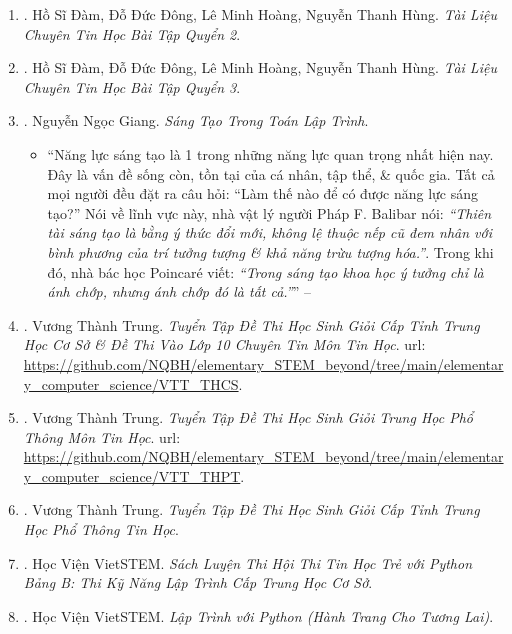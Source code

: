 \documentclass{article}
\begin{document}
\begin{enumerate}
	\item \cite{TL_chuyen_Tin_BT_quyen_2}. Hồ Sĩ Đàm, Đỗ Đức Đông, Lê Minh Hoàng, Nguyễn Thanh Hùng. {\it Tài Liệu Chuyên Tin Học Bài Tập Quyển 2}.
	
	\item \cite{TL_chuyen_Tin_BT_quyen_3}. Hồ Sĩ Đàm, Đỗ Đức Đông, Lê Minh Hoàng, Nguyễn Thanh Hùng. {\it Tài Liệu Chuyên Tin Học Bài Tập Quyển 3}.
	
	\item \cite{Giang_sang_tao_lap_trinh}. {\sc Nguyễn Ngọc Giang}. {\it Sáng Tạo Trong Toán Lập Trình}.	
	\begin{itemize}
		\item ``Năng lực sáng tạo là 1 trong những năng lực quan trọng nhất hiện nay. Đây là vấn đề sống còn, tồn tại của cá nhân, tập thể, \& quốc gia. Tất cả mọi người đều đặt ra câu hỏi: ``Làm thế nào để có được năng lực sáng tạo?'' Nói về lĩnh vực này, nhà vật lý người Pháp F. Balibar nói: {\it``Thiên tài sáng tạo là bằng ý thức đổi mới, không lệ thuộc nếp cũ đem nhân với bình phương của trí tưởng tượng \& khả năng trừu tượng hóa.''}. Trong khi đó, nhà bác học Poincar\'e viết: {\it``Trong sáng tạo khoa học ý tưởng chỉ là ánh chớp, nhưng ánh chớp đó là tất cả.''}'' -- \cite[Lời nói đầu]{Giang_sang_tao_lap_trinh}
	\end{itemize}
	
	\item \cite{Trung_THCS_Tin}. Vương Thành Trung. {\it Tuyển Tập Đề Thi Học Sinh Giỏi Cấp Tỉnh Trung Học Cơ Sở \& Đề Thi Vào Lớp 10 Chuyên Tin Môn Tin Học}. {\sc url}: \url{https://github.com/NQBH/elementary_STEM_beyond/tree/main/elementary_computer_science/VTT_THCS}.\hfill{\sf[reading]}
	
	\item \cite{Trung_THPT_Tin}. Vương Thành Trung. {\it Tuyển Tập Đề Thi Học Sinh Giỏi Trung Học Phổ Thông Môn Tin Học}. {\sc url}: \url{https://github.com/NQBH/elementary_STEM_beyond/tree/main/elementary_computer_science/VTT_THPT}.\hfill{\sf[reading]}
	
	\item \cite{Trung_HSG_THPT_Tin}. Vương Thành Trung. {\it Tuyển Tập Đề Thi Học Sinh Giỏi Cấp Tỉnh Trung Học Phổ Thông Tin Học}.\hfill{\sf[reading]}
	
	\item \cite{VietSTEM2021}. Học Viện VietSTEM. {\it Sách Luyện Thi Hội Thi Tin Học Trẻ  với Python Bảng B: Thi Kỹ Năng Lập Trình Cấp Trung Học Cơ Sở}.\hfill{\sf[reading]}
	
	\item \cite{VietSTEM2022}. Học Viện VietSTEM. {\it Lập Trình với Python (Hành Trang Cho Tương Lai)}.\hfill{\sf[done]}
\end{enumerate}
\end{document}

